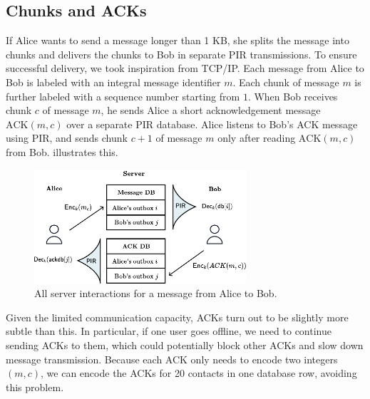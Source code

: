 \subsection{Chunks and ACKs}

If Alice wants to send a message longer than 1 KB, she splits the message into chunks and delivers the chunks to Bob in separate PIR transmissions. To ensure successful delivery, we took inspiration from TCP/IP. Each message from Alice to Bob is labeled with an integral message identifier $m$. Each chunk of message $m$ is further labeled with a sequence number starting from $1$. When Bob receives chunk $c$ of message $m$, he sends Alice a short acknowledgement message $\text{ACK}(m, c)$ over a separate PIR database. Alice listens to Bob's ACK message using PIR, and sends chunk $c + 1$ of message $m$ only after reading $\text{ACK}(m, c)$ from Bob.  illustrates this.

\begin{figure}
    \centering
    \includegraphics[width=0.7\textwidth]{ACK.pdf}
\caption{All server interactions for a message from Alice to Bob. }
\label{fig:pirandacks}
\end{figure}


Given the limited communication capacity, ACKs turn out to be slightly more subtle than this. In particular, if one user goes offline, we need to continue sending ACKs to them, which could potentially block other ACKs and slow down message transmission. Because each ACK only needs to encode two integers $(m, c)$, we can encode the ACKs for 20 contacts in one database row, avoiding this problem.